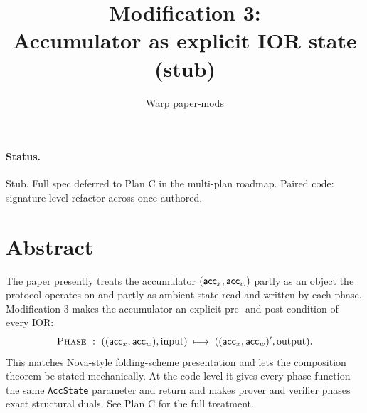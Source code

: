 \documentclass{article}
\title{Modification 3: \\ Accumulator as explicit IOR state (stub)}
\author{Warp paper-mods}
\date{}
\begin{document}
\maketitle

\paragraph{Status.} Stub. Full spec deferred to Plan C in the multi-plan
roadmap. Paired code: signature-level refactor across
 once authored.

\section*{Abstract}

The paper presently treats the accumulator \((\mathsf{acc}_x, \mathsf{acc}_w)\) partly as an
object the protocol operates on and partly as ambient state read and written
by each phase. Modification 3 makes the accumulator an explicit pre- and
post-condition of every IOR:
\[
    \IOR{Phase}\ :\ (\AccState, \text{input}) \;\longmapsto\; (\AccState', \text{output}).
\]
This matches Nova-style folding-scheme presentation and lets the composition
theorem be stated mechanically. At the code level it gives every phase
function the same \texttt{AccState} parameter and return and makes prover
and verifier phases exact structural duals. See Plan C for the full
treatment.
\end{document}
